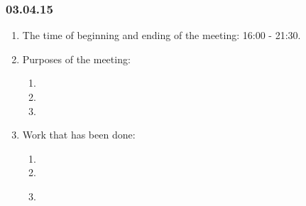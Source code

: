 \subsubsection{03.04.15}
\begin{enumerate}
	
	\item The time of beginning and ending of the meeting: 16:00 - 21:30.
	
	\item Purposes of the meeting: 
	\begin{enumerate}
		
		\item 
		
		\item 
		
        \item 
		
	\end{enumerate}

	\item Work that has been done:
	\begin{enumerate}
		
		\item 
		
		\item 
		
        \item 
		
        \begin{figure}[H]
	  	  \begin{minipage}[h]{0.2\linewidth}
	  	    \center  
	  	  \end{minipage}
	  	  \begin{minipage}[h]{0.6\linewidth}
	  		\caption{}
	  	  \end{minipage}
	   \end{figure}


\end{enumerate}
\end{enumerate}
